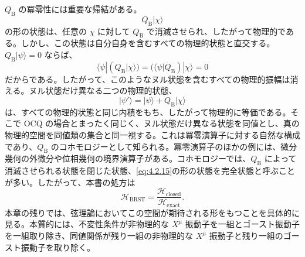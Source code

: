 $Q_{\mathrm B}$ の冪零性には重要な帰結がある。
\begin{equation}
Q_{\mathrm B}|\chi\rangle
\tag{4.2.15}\label{eq:4.2.15}
\end{equation}
の形の状態は、任意の $\chi$ に対して $Q_{\mathrm B}$ で消滅させられ、したがって物理的である。しかし、この状態は自分自身を含むすべての物理的状態と直交する。$Q_{\mathrm B}|\psi\rangle=0$ ならば、
\begin{equation}
\langle\psi|(Q_{\mathrm B}|\chi\rangle)
=(\langle\psi|Q_{\mathrm B})|\chi\rangle=0
\tag{4.2.16}\label{eq:4.2.16}
\end{equation}
だからである。したがって、このようなヌル状態を含むすべての物理的振幅は消える。ヌル状態だけ異なる二つの物理的状態、
\begin{equation}
|\psi'\rangle=|\psi\rangle+Q_{\mathrm B}|\chi\rangle
\tag{4.2.17}\label{eq:4.2.17}
\end{equation}
は、すべての物理的状態と同じ内積をもち、したがって物理的に等価である。そこで OCQ の場合とまったく同じく、ヌル状態だけ異なる状態を同値とし、真の物理的空間を同値類の集合と同一視する。これは冪零演算子に対する自然な構成であり、$Q_{\mathrm B}$ のコホモロジーとして知られる。冪零演算子のほかの例には、微分幾何の外微分や位相幾何の境界演算子がある。コホモロジーでは、$Q_{\mathrm B}$ によって消滅させられる状態を閉じた状態、\eqref{eq:4.2.15}の形の状態を完全状態と呼ぶことが多い。したがって、本書の処方は
\begin{equation}
\mathcal H_{\mathrm{BRST}}
=\frac{\mathcal H_{\mathrm{closed}}}{\mathcal H_{\mathrm{exact}}}.
\tag{4.2.18}\label{eq:4.2.18}
\end{equation}
本章の残りでは、弦理論においてこの空間が期待される形をもつことを具体的に見る。本質的には、不変性条件が非物理的な $X^\mu$ 振動子を一組とゴースト振動子を一組取り除き、同値関係が残り一組の非物理的な $X^\mu$ 振動子と残り一組のゴースト振動子を取り除く。


